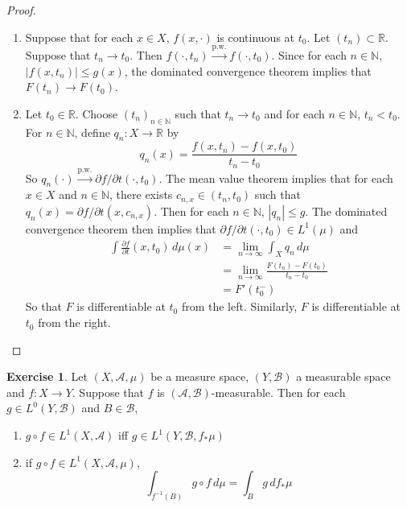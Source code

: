 \documentclass[12pt]{amsart}
\theoremstyle{definition}
\newtheorem{ex}[definition]{Exercise}
\newcommand{\N}{\mathbb{N}}
\newcommand{\R}{\mathbb{R}}
\newcommand{\MA}{\mathcal{A}}
\newcommand{\MB}{\mathcal{B}}
\newcommand{\dmu}{\, d \mu}
\newcommand{\p}{\partial}
\newcommand{\limn}{\lim \limits_{n \rightarrow \infty}}
\newcommand{\convt}[1]{\xrightarrow{\text{#1}}}
\begin{document}
	\begin{proof}\
	\begin{enumerate}
	\item Suppose that for each $x \in X$, $f(x, \cdot)$ is continuous at $t_0$. Let $(t_n) \subset \R$. Suppose that $t_n \rightarrow t_0$. Then $f(\cdot , t_n) \convt{p.w.} f(\cdot, t_0)$. Since for each $n \in \N$, $|f(x,t_n)| \leq g(x)$, the dominated convergence theorem implies that $F(t_n) \rightarrow F(t_0)$.
	\item Let $t_0 \in \R$. Choose $(t_n)_{n \in \N}$ such that $ t_n \rightarrow t_0$ and for each $n \in \N$, $t_n < t_0$. For $n \in \N$, define $q_n:X \rightarrow \R$ by $$q_n(x) = \frac{f(x,t_n) - f(x, t_0)}{t_n - t_0}$$ So $q_n(\cdot) \convt{p.w.} \p f / \p t (\cdot, t_0)$. The mean value theorem implies that for each $x \in X$ and $n \in \N$, there exists $c_{n,x} \in (t_n,t_0)$ such that $q_n(x) = \p f / \p t (x, c_{n,x})$. Then for each $n \in \N$, $|q_n| \leq g$. The dominated convergence theorem then implies that $\p f / \p t (\cdot, t_0) \in L^1(\mu)$ and 
	\begin{align*}
	\int \frac{\p f }{\p t} (x, t_0) \dmu(x) 
	&=  \limn \int_X q_n \dmu  \\
	&= \limn \frac{F(t_n) - F(t_0)}{t_n - t_0} \\
	&= F'(t_0^-) 	
	\end{align*}
	So that $F$ is differentiable at $t_0$ from the left. Similarly, $F$ is differentiable at $t_0$ from the right. 
	\end{enumerate}
	\end{proof}

	\begin{ex}
		Let $(X, \MA, \mu)$ be a measure space, $(Y, \MB)$ a measurable space and $f: X \rightarrow Y$. Suppose that $f$ is $(\MA, \MB)$-measurable. Then for each $g \in L^0(Y, \MB)$ and $B \in \MB$, 
		\begin{enumerate}
			\item $g \circ f \in L^1(X, \MA)$ iff $g \in L^1(Y, \MB, f_* \mu)$
			\item if $g \circ f \in L^1(X, \MA, \mu)$, 
			$$\int_{f^{-1}(B)} g \circ f \dmu = \int_B g \, d f_*\mu$$
		\end{enumerate}
	\end{ex}
\end{document}
